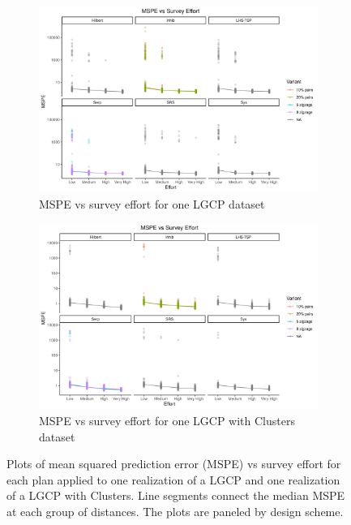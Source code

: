 \documentclass[review]{elsarticle}
\begin{document}
\begin{figure}

\begin{subfigure}{5in}
\includegraphics[width=5in]{../graphics/MSPE-effort-LGCP000004.png}
\caption{MSPE vs survey effort for one LGCP dataset}
\label{mspelgcp}
\end{subfigure}

\begin{subfigure}{5in}
\includegraphics[width=5in]{../graphics/MSPE-effort-Cluster000004.png}
\caption{MSPE vs survey effort for one LGCP with Clusters dataset}
\label{mspecluster}
\end{subfigure}

\caption{Plots of mean squared prediction error (MSPE) vs survey effort for
each plan applied to one realization of a LGCP and one realization of a LGCP
with Clusters. Line segments connect the median MSPE at each group of
distances. The plots are paneled by design scheme.}
\label{msperesults}
\end{figure}
\end{document}
